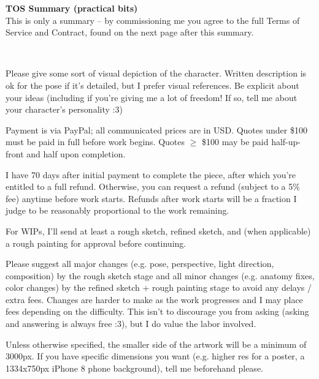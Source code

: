 \documentclass{article}
\newcommand{\hsp}[1][5]{\hspace{0.#1 cm}}
\newcommand{\hcm}[1][1]{\hspace{#1 cm}}
\begin{document}
\begin{center}
	\parbox{12cm}{
		\begin{center}
			\textbf{\large TOS Summary (practical bits)}\\[12pt]

			This is only a summary -- by commissioning me you agree to the full Terms of Service and Contract, found on the next page after this summary.
		\end{center}
	}
\end{center}

\begin{flushleft}
\hcm\\

\begin{center}
	\parbox{14cm}{
		Please give some sort of visual depiction of the character. Written description is ok for the pose if it's detailed, but I prefer visual references. Be explicit about your ideas (including if you're giving me a lot of freedom! If so, tell me about your character's personality :3)\\\hcm

		Payment is via PayPal; all communicated prices are in USD. Quotes under \$100 must be paid in full before work begins. Quotes $\geq$ \$100 may be paid half-up-front and half upon completion.\\\hcm

		I have 70 days after initial payment to complete the piece, after which you're entitled to a full refund. Otherwise, you can request a refund (subject to a 5\% fee) anytime before work starts. Refunds after work starts will be a fraction I judge to be reasonably proportional to the work remaining.\\\hsp

		For WIPs, I'll send at least a rough sketch, refined sketch, and (when applicable) a rough painting for approval before continuing.\\\hcm

		Please suggest all major changes (e.g. pose, perspective, light direction, composition) by the rough sketch stage and all minor changes (e.g. anatomy fixes, color changes) by the refined sketch + rough painting stage to avoid any delays / extra fees. Changes are harder to make as the work progresses and I may place fees depending on the difficulty. This isn't to discourage you from asking (asking and answering is always free :3), but I do value the labor involved.\\\hcm

		Unless otherwise specified, the smaller side of the artwork will be a minimum of 3000px. If you have specific dimensions you want (e.g. higher res for a poster, a 1334x750px iPhone 8 phone background), tell me beforehand please.\\\hcm

}
\end{center}
\end{flushleft}
\end{document}
